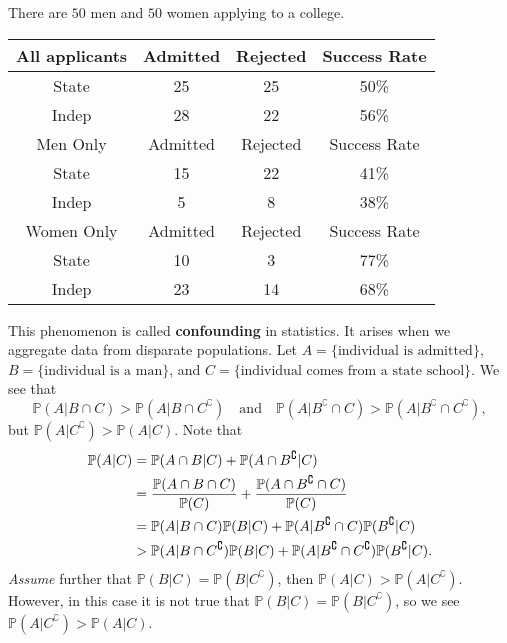 \begin{example}
    There are $50$ men and $50$ women applying to a college.
    \begin{center}
        \begin{tabular}{|c|c|c|c|}
            \hline
            All applicants&Admitted&Rejected&Success Rate\\
            \hline
            State&25&25&50\%\\
            Indep&28&22&56\%\\
            \hline
            Men Only&Admitted&Rejected&Success Rate\\
            \hline
            State&15&22&41\%\\
            Indep&5&8&38\%\\
            \hline
            Women Only&Admitted&Rejected&Success Rate\\
            \hline
            State&10&3&77\%\\
            Indep&23&14&68\%\\ 
            \hline
        \end{tabular}
    \end{center}
    This phenomenon is called \textbf{confounding} in statistics. It arises when we aggregate data from disparate populations. Let $ A = \{\text{individual is admitted}\} $, $ B = \{\text{individual is a man}\} $, and $ C = \{\text{individual comes from a state school}\} $. We see that 
    \[
        \mathbb{P}(A|B \cap C)>\mathbb{P}(A|B \cap C^\complement)\quad \text{and}\quad \mathbb{P}(A|B^\complement \cap C)> \mathbb{P}(A| B^\complement \cap C^\complement),
    \]
    but $ \mathbb{P}(A|C^\complement)>\mathbb{P}(A|C) $. Note that
    \begin{align*}
        \mathbb{P}(A|C) &= \mathbb{P}(A \cap B|C)+\mathbb{P}(A \cap B^\complement|C)\\ 
        &= \frac{{\mathbb{P}}(A\cap B\cap C)}{{\mathbb{P}}(C)}+\frac{{\mathbb{P}}(A\cap B^\complement\cap C)}{{\mathbb{P}}(C)}\\ 
        &= \mathbb{P}(A|B\cap C)\mathbb{P}(B|C)+\mathbb{P}(A|B^\complement \cap C)\mathbb{P}(B^\complement|C)\\ 
        &> \mathbb{P}(A|B\cap C^\complement)\mathbb{P}(B|C)+\mathbb{P}(A|B^\complement \cap C^\complement)\mathbb{P}(B^\complement|C).
    \end{align*}
    \textit{Assume} further that $ \mathbb{P}(B|C) = \mathbb{P}(B|C^\complement) $, then $ \mathbb{P}(A|C)>\mathbb{P}(A|C^\complement) $. However, in this case it is not true that $ \mathbb{P}(B|C) = \mathbb{P}(B|C^\complement) $, so we see $ \mathbb{P}(A|C^\complement)>\mathbb{P}(A|C) $.
\end{example}